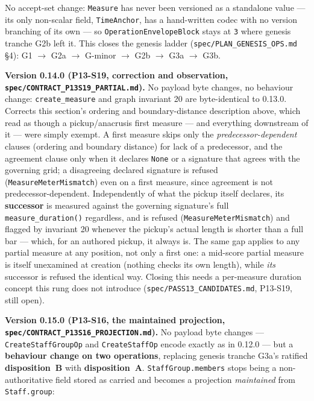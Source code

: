 \documentclass[11pt,letterpaper]{report}
\begin{document}
No accept-set change: \texttt{Measure} has never been versioned as a
standalone value --- its only non-scalar field, \texttt{TimeAnchor}, has a
hand-written codec with no version branching of its own --- so
\texttt{OperationEnvelopeBlock} stays at \texttt{3} where genesis tranche
G2b left it. This closes the genesis ladder
(\texttt{spec/PLAN\_GENESIS\_OPS.md} \S4): G1 $\rightarrow$ G2a $\rightarrow$
G-minor $\rightarrow$ G2b $\rightarrow$ G3a $\rightarrow$ G3b.

\medskip

\noindent\textbf{Version 0.14.0 (P13-S19, correction and observation,
\texttt{spec/CONTRACT\_P13S19\_PARTIAL.md}).} No payload byte changes, no
behaviour change: \texttt{create\_measure} and graph invariant 20 are
byte-identical to 0.13.0. Corrects this section's ordering and
boundary-distance description above, which read as though a pickup/anacrusis
first measure --- and everything downstream of it --- were simply exempt. A
first measure skips only the \emph{predecessor-dependent} clauses (ordering
and boundary distance) for lack of a predecessor, and the agreement clause
only when it declares \texttt{None} or a signature that agrees with the
governing grid; a disagreeing declared signature is refused
(\texttt{MeasureMeterMismatch}) even on a first measure, since agreement is
not predecessor-dependent. Independently of what the pickup itself declares,
its \textbf{successor} is measured against the governing signature's full
\texttt{measure\_duration()} regardless, and is refused
(\texttt{MeasureMeterMismatch}) and flagged by invariant 20 whenever the
pickup's actual length is shorter than a full bar --- which, for an authored
pickup, it always is. The same gap applies to any partial measure at any
position, not only a first one: a mid-score partial measure is itself
unexamined at creation (nothing checks its own length), while \emph{its}
successor is refused the identical way. Closing this needs a per-measure
duration concept this rung does not introduce
(\texttt{spec/PASS13\_CANDIDATES.md}, P13-S19, still open).

\medskip

\noindent\textbf{Version 0.15.0 (P13-S16, the maintained projection,
\texttt{spec/CONTRACT\_P13S16\_PROJECTION.md}).} No payload byte changes ---
\texttt{CreateStaffGroupOp} and \texttt{CreateStaffOp} encode exactly as in
0.12.0 --- but a \textbf{behaviour change on two operations}, replacing genesis
tranche G3a's ratified \textbf{disposition~B} with \textbf{disposition~A}.
\texttt{StaffGroup.members} stops being a non-authoritative field stored as
carried and becomes a projection \emph{maintained} from \texttt{Staff.group}:
\end{document}
